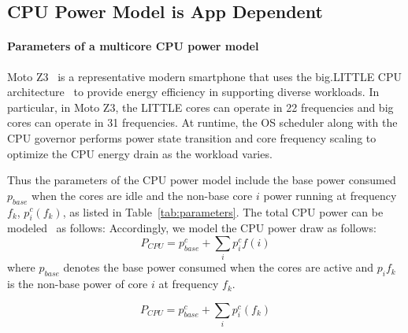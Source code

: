 \subsection{CPU Power Model is App Dependent}
\label{sec:primer_cpu}


\paragraph{Parameters of a multicore CPU power model}
Moto Z3~\cite{motoz3} is a representative modern smartphone
that uses the big.LITTLE CPU architecture~\cite{biglittlearch} to
provide energy efficiency in supporting diverse workloads.
In particular, in Moto Z3, the LITTLE cores can operate in 22 frequencies 
and big cores can operate in 31 frequencies.
At runtime, the OS scheduler along with the CPU governor performs power state transition and core frequency scaling to optimize the CPU energy drain as the workload varies.

Thus the parameters of the CPU power model include
the base power consumed $p_{base}$ when the cores are idle and
the non-base core $i$ power running at frequency $f_k$, $p^c_i(f_k)$, as listed in Table~\ref{tab:parameters}.
The total CPU power can be modeled~\cite{multicoremodel:2015} as follows:
Accordingly, we model the CPU power draw as follows:
\begin{equation}
    P_{CPU} = p^c_{base} + \sum_i p^c_i{f(i)}
\end{equation}
where $p_{base}$ denotes the base power consumed when the cores are active and
$p_i{f_k}$ is the non-base power of core $i$ at frequency $f_k$.
\fi
{
\begin{equation}
    P_{CPU} = p^c_{base} + \sum_{i} p^c_i(f_k)
\end{equation}

}


